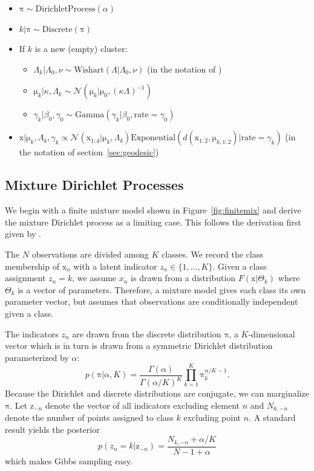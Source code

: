 \documentclass[english]{article}
\newcommand{\+}[1]{\ensuremath{\boldsymbol{\mathrm{#1}}}}
\begin{document}
\begin{itemize}
\item $\+\pi \sim \text{DirichletProcess}(\alpha)$
\item $k | \+\pi \sim \text{Discrete}(\+\pi)$
\item If $k$ is a new (empty) cluster:
  \begin{itemize}
  \item $\Lambda_k | \Lambda_0, \nu \sim \text{Wishart}(\Lambda | \Lambda_0, \nu)$ (in the notation of \cite{Murphy2003})
  \item $\+\mu_k | \kappa , \Lambda_k \sim \mathcal{N}\left( \+\mu_k | \+\mu_0 , (\kappa\Lambda)^{-1} \right)$
  \item $\gamma_k | \beta_0, \gamma_0 \sim \text{Gamma}(\gamma_k | \beta_0, \text{rate} = \gamma_0)$
  \end{itemize}
\item $\+x | \+\mu_k , \Lambda_k, \gamma_k \propto \mathcal{N}(\+x_{1:4} | \+\mu_k , \Lambda_k) \text{Exponential}\left( d(\+x_{1:2}, \+\mu_{k,1:2}) | \text{rate} = \gamma_k \right) \label{eq:xlike}$ (in the notation of section~\ref{sec:geodesic})
\end{itemize}

\subsection{Mixture Dirichlet Processes}
\label{sec:mdp}
We begin with a finite mixture model shown in Figure~\ref{fig:finitemix} and derive the mixture Dirichlet process as a limiting case. This follows the derivation first given by \cite{Rasmussen2000}.

The $N$ observations are divided among $K$ classes. We record the class membership of $\+{x}_n$ with a latent indicator $z_n \in \{1, \ldots, K \}$. Given a class assignment $z_n = k$, we assume $x_n$ is drawn from a distribution $F(\+{x}|\Theta_k)$ where $\Theta_k$ is a vector of parameters. Therefore, a mixture model gives each class its own parameter vector, but assumes that observations are conditionally independent given a class.

The indicators $z_n$ are drawn from the discrete distribution $\+\pi$, a $K$-dimensional vector which is in turn is drawn from a symmetric Dirichlet distribution parameterized by $\alpha$: $$p \left( \+\pi | \alpha, K \right) = \frac{ \Gamma ( \alpha ) }{ \Gamma ( \alpha/K ) ^K} \prod_{k=1}^K \+\pi_k^{\alpha/K - 1}.$$ Because the Dirichlet and discrete distributions are conjugate, we can marginalize $\+\pi$. Let $\+{z}_{-n}$ denote the vector of all indicators excluding element $n$ and $N_{k,-n}$ denote the number of points assigned to class $k$ excluding point $n$. A standard result \cite{Rasmussen2000} yields the posterior $$p(z_n = k | \+{z}_{-n})  = \frac{ N_{k,-n} + \alpha/K }{ N - 1 + \alpha }$$ which makes Gibbs sampling easy.
\end{document}
